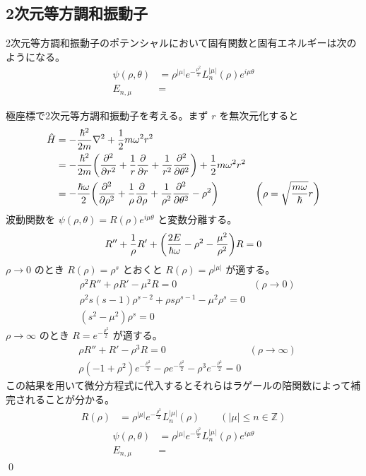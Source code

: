 \documentclass[uplatex,dvipdfmx,a4paper,11pt]{jlreq}
\makeatletter
\newcommand{\ZZ}{\mathbb{Z}}
\theoremstyle{definition}
\renewenvironment{proof}[1][\proofname]{\par
  \normalfont
  \topsep6\p@\@plus6\p@ \trivlist
  \item[\hskip\labelsep{\bfseries #1}\@addpunct{\bfseries}]\ignorespaces\quad\par
}{%
  \qed\endtrivlist\@endpefalse
}
\renewcommand\proofname{証明}
\makeatother
\begin{document}
\subsection{2次元等方調和振動子}
\begin{proposition}
  2次元等方調和振動子のポテンシャルにおいて固有関数と固有エネルギーは次のようになる。
  \begin{align}
    \psi(\rho, \theta) & = \rho^{|\mu|}e^{-\frac{\rho^2}{2}}L_n^{|\mu|}(\rho)e^{i\mu\theta} \\
    E_{n, \mu}         & =
  \end{align}
\end{proposition}
\begin{proof}
  極座標で2次元等方調和振動子を考える。まず $r$ を無次元化すると
  \begin{align}
    \hat{H} & = -\frac{\hbar^2}{2m}\laplacian + \frac{1}{2}m\omega^2r^2                                                                                                        \\
            & = -\frac{\hbar^2}{2m}\qty(\pdv[2]{r} + \frac{1}{r}\pdv{r} + \frac{1}{r^2}\pdv[2]{\theta}) + \frac{1}{2}m\omega^2r^2                                              \\
            & = -\frac{\hbar\omega}{2}\qty(\pdv[2]{\rho} + \frac{1}{\rho}\pdv{\rho} + \frac{1}{\rho^2}\pdv[2]{\theta} - \rho^2)   & \qty(\rho = \sqrt{\frac{m\omega}{\hbar}}r)
  \end{align}
  波動関数を $\psi(\rho, \theta) = R(\rho)e^{i\mu\theta}$ と変数分離する。
  \begin{align}
    R'' + \frac{1}{\rho}R' + \qty(\frac{2E}{\hbar\omega} - \rho^2 - \frac{\mu^2}{\rho^2})R = 0
  \end{align}
  $\rho\to 0$ のとき $R(\rho) = \rho^s$ とおくと $R(\rho) = \rho^{|\mu|}$ が適する。
  \begin{align}
     & \rho^2R'' + \rho R' - \mu^2R = 0                              & (\rho\to 0) \\
     & \rho^2s(s - 1)\rho^{s-2} + \rho s\rho^{s-1} - \mu^2\rho^s = 0               \\
     & (s^2 - \mu^2)\rho^s = 0
  \end{align}
  $\rho\to\infty$ のとき $R = e^{-\frac{\rho^2}{2}}$ が適する。
  \begin{align}
     & \rho R'' + R' - \rho^3R = 0                                                                            & (\rho\to\infty) \\
     & \rho (-1 + \rho^2)e^{-\frac{\rho^2}{2}} - \rho e^{-\frac{\rho^2}{2}} - \rho^3e^{-\frac{\rho^2}{2}} = 0
  \end{align}
  この結果を用いて微分方程式に代入するとそれらはラゲールの陪関数によって補完されることが分かる。
  \begin{align}
    R(\rho) & = \rho^{|\mu|}e^{-\frac{\rho^2}{2}}L_n^{|\mu|}(\rho) \qquad (|\mu|\leq n\in\ZZ)
  \end{align}
  \begin{align}
    \psi(\rho, \theta) & = \rho^{|\mu|}e^{-\frac{\rho^2}{2}}L_n^{|\mu|}(\rho)e^{i\mu\theta} \\
    E_{n, \mu}         & =
  \end{align}
\end{proof}
\end{document}
